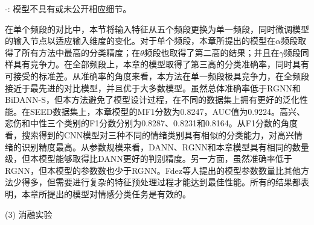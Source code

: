 \begin{table*}[!h]
{\begin{threeparttable}
{\begin{tabular}{cccccccc}
            \bottomrule
        \end{tabular}
        }
        \begin{tablenotes}
	    \footnotesize
	    \item -: 模型不具有或未公开相应细节。
    \end{tablenotes}
    \end{threeparttable}
    }
\end{table*}

在单个频段的对比中，本节将输入特征从五个频段更换为单一频段，同时微调模型的输入节点以适应输入维度的变化。对于单个频段，本章所提出的模型在$\alpha$频段取得了所有方法中最高的分类精度；在$\theta$频段也取得了第二高的结果；并且在$\gamma$频段同样具有竞争力。在全部频段上，本章的模型取得了第三高的分类准确率，同时具有可接受的标准差。从准确率的角度来看，本方法在单一频段极具竞争力，在全频段接近于最先进的对比模型，并且优于大多数模型。虽然总体准确率低于RGNN和BiDANN-S，但本方法避免了模型设计过程，在不同的数据集上拥有更好的泛化性能。在SEED数据集上，本章模型的MF1分数为0.8247，AUC值为0.9224。高兴、悲伤和中性三个类别的F1分数分别为0.8287、0.8231和0.8164。从F1分数的角度看，搜索得到的CNN模型对三种不同的情绪类别具有相似的分类能力，对高兴情绪的识别精度最高。从参数规模来看，DANN、RGNN和本章模型具有相同的数量级，但本模型能够取得比DANN更好的判别精度。另一方面，虽然准确率低于RGNN，但本模型的参数数也少于RGNN。Fdez等人提出的模型\cite{3-22}参数数量比其他方法少得多，但需要进行复杂的特征预处理过程才能达到最佳性能。所有的结果都表明，本章所提出的模型对情感分类任务是有效的。

(3) 消融实验

